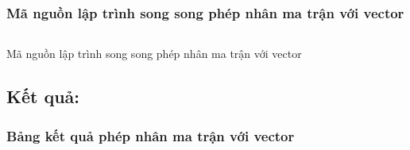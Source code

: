 \subsubsection{Mã nguồn lập trình song song phép nhân ma trận với vector}
\begin{listing}[H]
    \centering
    \inputminted{cpp}{sources/MaNguon1SS.cpp}
    \caption{Mã nguồn lập trình song song phép nhân ma trận với vector}
    \label{code:MaNguon1SS}
\end{listing}
\newpage
\subsection{Kết quả:}
\subsubsection{Bảng kết quả phép nhân ma trận với vector}




